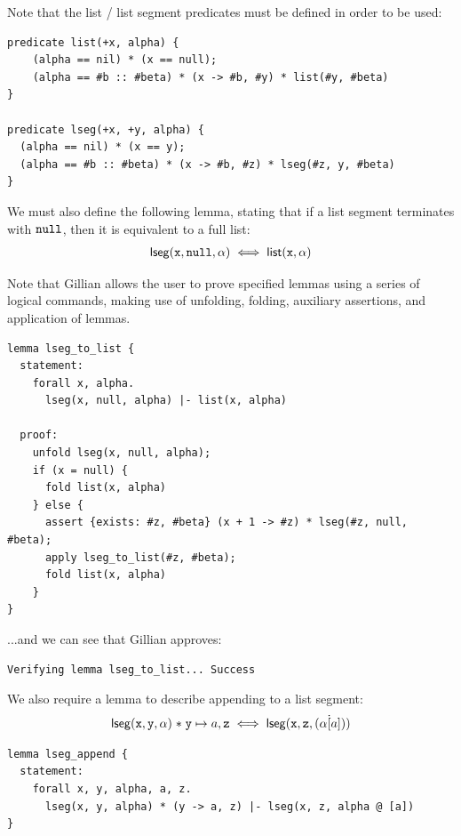 Note that the list / list segment predicates must be defined in order to be used:

\begin{lstlisting}[caption={List predicates in WISL}, style=code, numbers=none]
predicate list(+x, alpha) {
    (alpha == nil) * (x == null);
    (alpha == #b :: #beta) * (x -> #b, #y) * list(#y, #beta)
}

predicate lseg(+x, +y, alpha) {
  (alpha == nil) * (x == y);
  (alpha == #b :: #beta) * (x -> #b, #z) * lseg(#z, y, #beta)
}
\end{lstlisting}

We must also define the following lemma, stating that if a list segment
terminates with $\mathtt{null}$, then it is equivalent to a full list:
\begin{align*}
  \mathsf{lseg}(\mathtt{x}, \mathtt{null}, \alpha) \iff \mathsf{list}(\mathtt{x}, \alpha)
\end{align*}

Note that Gillian allows the user to prove specified lemmas using a series of logical commands, making use of unfolding, folding, auxiliary assertions, and application of lemmas.

\begin{lstlisting}[caption={List lemma in WISL}, style=code, numbers=none]
lemma lseg_to_list {
  statement:
    forall x, alpha.
      lseg(x, null, alpha) |- list(x, alpha)

  proof:
    unfold lseg(x, null, alpha);
    if (x = null) {
      fold list(x, alpha)
    } else {
      assert {exists: #z, #beta} (x + 1 -> #z) * lseg(#z, null, #beta);
      apply lseg_to_list(#z, #beta);
      fold list(x, alpha)
    }
}
\end{lstlisting}

...and we can see that Gillian approves:

\begin{lstlisting}[style=code, numbers=none, caption={List lemma in WISL - Gillian output}]
Verifying lemma lseg_to_list... Success
\end{lstlisting}

We also require a lemma to describe appending to a list segment:
\begin{align*}
    \mathsf{lseg}(\mathtt{x}, \mathtt{y}, \alpha) \mathrel{*} \mathtt{y} \mapsto a, \mathtt{z} \iff \mathsf{lseg}(\mathtt{x}, \mathtt{z}, (\alpha \dot [a]))
\end{align*}

\begin{lstlisting}[style=code, numbers=none, caption={List segment lemma in WISL}]
lemma lseg_append {
  statement:
    forall x, y, alpha, a, z.
      lseg(x, y, alpha) * (y -> a, z) |- lseg(x, z, alpha @ [a])
}
\end{lstlisting}

